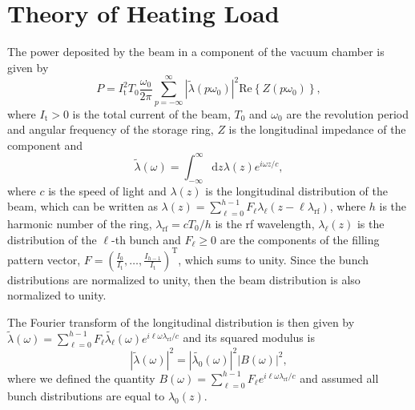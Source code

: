 \documentclass
[
    a4paper,
    biblatex,     %
]{jacow}
\providecommand{\der}{\mathrm{d}}
\providecommand{\rf}{\mathrm{rf}}
\providecommand{\Real}[1]{\ensuremath{\mathrm{Re}\left\{#1\right\}}}
\begin{document}
\section{Theory of Heating Load}
    The power deposited by the beam in a component of the vacuum chamber is given by
    \begin{equation}\label{eq:power_general}
        P = I_\mathrm{t}^2T_0 \frac{\omega_0}{2\pi}\sum_{p=-\infty}^{\infty} \left|\tilde{\lambda}(p\omega_0)\right|^2\Real{Z(p\omega_0)},
    \end{equation}
    where $I_\mathrm{t}>0$ is the total current of the beam, $T_0$ and $\omega_0$ are the revolution period and angular frequency of the storage ring, $Z$ is the longitudinal impedance of the component and 
    \begin{equation}
        \tilde{\lambda}(\omega) = \int_{-\infty}^\infty\der z \lambda(z) e^{i\omega z/c},
    \end{equation}
    where $c$ is the speed of light and $\lambda(z)$ is the longitudinal distribution of the beam, which can be written as
    $
        \lambda(z) = \sum_{\ell=0}^{h-1} F_\ell \lambda_\ell(z - \ell \lambda_\rf)
    $,
    where $h$ is the harmonic number of the ring, $\lambda_\rf=cT_0/h$ is the rf wavelength, $\lambda_\ell(z)$ is the distribution of the $\ell$-th bunch and $F_\ell \ge 0$ are the components of the filling pattern vector,
    $
    F = \left(\frac{I_0}{I_\mathrm{t}},\dots, \frac{I_{h-1}}{I_\mathrm{t}}\right)^\mathrm{T}
    $,
    which sums to unity. Since the bunch distributions are normalized to unity, then the beam distribution is also normalized to unity.
    
    The Fourier transform of the longitudinal distribution is then given by
    $
        \tilde{\lambda}(\omega) = \sum_{\ell=0}^{h-1}F_\ell\tilde{\lambda_\ell}(\omega)e^{i\ell\omega \lambda_\rf/c}
    $
    and its squared modulus is
    \begin{equation}\label{eq:modulus_squared}
        \left|\tilde{\lambda}(\omega)\right|^2 = \left|\tilde{\lambda_0}(\omega)\right|^2 \left|B(\omega)\right|^2,
    \end{equation}
    where we defined the quantity $B(\omega) = \sum_{\ell=0}^{h-1}F_\ell e^{i\ell\omega \lambda_\rf/c}$
    and assumed all bunch distributions are equal to $\lambda_0(z)$.
\end{document}
